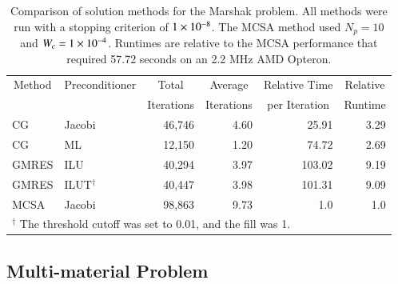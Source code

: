 \documentclass[preprint,12pt]{elsarticle}
\begin{document}
\begin{table}[ht!]
  \caption{Comparison of solution methods for the Marshak problem. All
    methods were run with a stopping criterion of $1\times 10^{-8}$.  The
    MCSA method used $N_p=10$ and $W_c = 1\times 10^{-4}$.   Runtimes are relative
    to the MCSA performance that required 57.72 seconds on
    an 2.2 MHz AMD Opteron.}
  \label{tab:marshak_comparison}
  \begin{center}
    \small
    \begin{tabular}{llrrrr}\hline\hline
      \multicolumn{1}{c}{Method} &
      \multicolumn{1}{c}{Preconditioner} &
      \multicolumn{1}{c}{Total} &
      \multicolumn{1}{c}{Average} &
      \multicolumn{1}{c}{Relative Time} &
      \multicolumn{1}{c}{Relative}\\
      & & \multicolumn{1}{c}{Iterations} &
      \multicolumn{1}{c}{Iterations} &
      \multicolumn{1}{c}{per Iteration} &
      \multicolumn{1}{c}{Runtime} \\\hline\hline
      CG & Jacobi & 46,746 & 4.60 & 25.91 & 3.29 \\
      CG & ML & 12,150 & 1.20 & 74.72 & 2.69 \\
      GMRES & ILU & 40,294 & 3.97 & 103.02 & 9.19 \\
      GMRES & ILUT$^{\dagger}$ & 40,447 & 3.98 & 101.31 & 9.09 \\
      MCSA & Jacobi & 98,863 & 9.73 & 1.0 & 1.0
      \\ \hline\hline
      \multicolumn{6}{l}{
        $^{\dagger}$ The threshold cutoff was set to 0.01, and the fill was 1.}
    \end{tabular}
  \end{center}
\end{table}

\subsection{Multi-material Problem}
\end{document}
